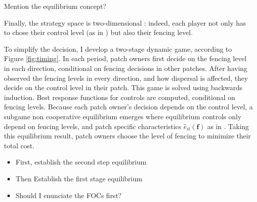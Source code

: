 Mention the equilibrium concept?

Finally, the strategy space is two-dimensional : indeed, each player not only has to chose their control level (as in \cite{costello_private_2017}) but also their fencing level. 


To simplify the decision, I develop a two-stage dynamic game, according to Figure \ref{fig:timing}. In each period, patch owners first decide on the fencing level in each direction, conditional on fencing decisions in other patches. After having observed the fencing levels in every direction, and how dispersal is affected, they decide on the control level in their patch. This game is solved using backwards induction. Best response functions for controls are computed, conditional on fencing levels. Because each patch owner's decision depends on the control level, a subgame non cooperative equilibrium emerges where equilibrium controls only depend on fencing levels, and patch specific characteristics $\hat{e}_{it}(\mathbf{f})$ as in \citep{costello_private_2017}. Taking this equilibrium result, patch owners choose the level of fencing to minimize their total cost.






\begin{itemize}
\item First, establish the second step equilibrium
\item Then Establish the first stage equilibrium
\item Should I enunciate the FOCs first?
\end{itemize}


\newpage



